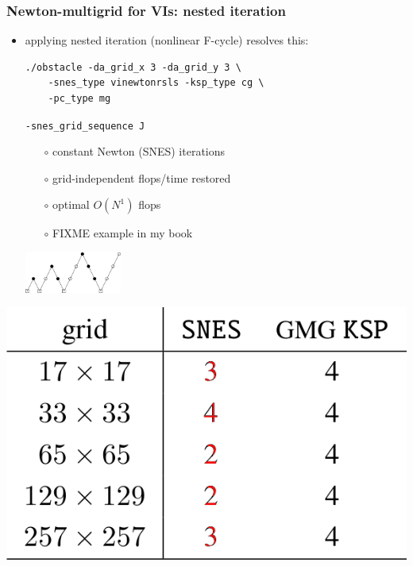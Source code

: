 \documentclass[svgnames,
               hyperref={colorlinks,citecolor=DeepPink4,linkcolor=FireBrick,urlcolor=Maroon},
               usepdftitle=false]  %
               {beamer}
\begin{document}
\begin{frame}[fragile]
\frametitle{Newton-multigrid for VIs: nested iteration}

\begin{itemize}
\item applying nested iteration (nonlinear F-cycle) resolves this:

\vspace{2mm}
\begin{Verbatim}[xleftmargin=13mm,fontsize=\scriptsize]
./obstacle -da_grid_x 3 -da_grid_y 3 \
    -snes_type vinewtonrsls -ksp_type cg \
    -pc_type mg
\end{Verbatim}

\vspace{-4.9mm}
\hspace{39mm} {\scriptsize \color{FireBrick} \texttt{-snes\_grid\_sequence J}}

\vspace{2mm}
    \begin{itemize}
    \item[$\circ$] constant Newton (SNES) iterations
    \item[$\circ$] grid-independent flops/time restored
    \item[$\circ$] optimal $O(N^1)$ flops
    \item[$\circ$] FIXME example in my book
    \end{itemize}

\vspace{-12mm}
\hfill \includegraphics[width=0.25\textwidth]{images/mg-fcycle.png}
\end{itemize}

\bigskip
\hspace{10mm} \includegraphics[height=0.25\textheight]{images/vi-newton-gmg-good.png} 


\end{frame}
\end{document}
